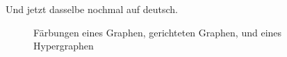 Und jetzt dasselbe nochmal auf deutsch.



\begin{figure}[htp!]
\centering
\resizebox{.7\linewidth}{!}{

}
\caption*{Färbungen eines Graphen, gerichteten Graphen, und eines Hypergraphen}
\end{figure}